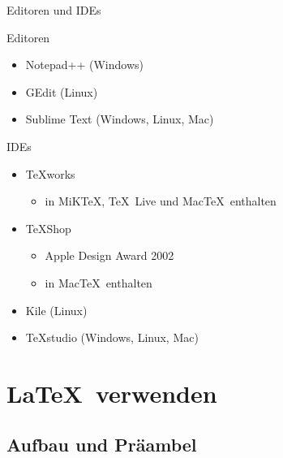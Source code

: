 \begin{Frame}{Editoren und IDEs}
  \begin{Block}{Editoren}
    \begin{itemize}
      \item Notepad++ (Windows)
      \item GEdit (Linux)
      \item Sublime Text (Windows, Linux, Mac)
    \end{itemize}
  \end{Block}

  \pause

  \begin{Block}{IDEs}
    \begin{itemize}
      \item \TeX works
        \begin{itemize}
          \item in MiK\TeX, \TeX\ Live und Mac\TeX\ enthalten
        \end{itemize}
      \item \TeX Shop
        \begin{itemize}
          \item Apple Design Award 2002
          \item in Mac\TeX\ enthalten
        \end{itemize}
      \item Kile (Linux)
      \item TeXstudio (Windows, Linux, Mac)
    \end{itemize}
  \end{Block}
\end{Frame}

\section{\LaTeX\ verwenden}

\subsection{Aufbau und Präambel}

